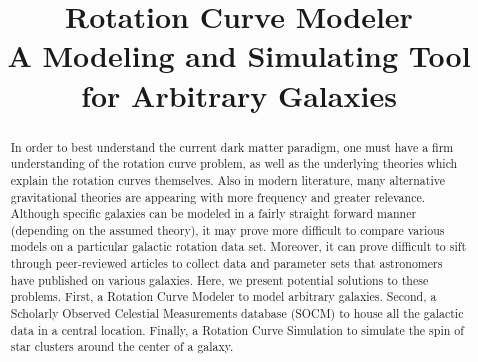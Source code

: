 \documentclass[conference]{IEEEtran-modified}
\begin{document}
\title{Rotation Curve Modeler \\ \Large{A Modeling and Simulating Tool for Arbitrary Galaxies}}

\author{
\and
{}
}

\onecolumn


\maketitle
\begin{abstract}
In order to best understand the current dark matter paradigm, one must have a firm understanding of the rotation curve problem, as well as the underlying theories which explain the rotation curves themselves.  Also in modern literature, many alternative gravitational theories are appearing with more frequency and greater relevance. Although specific galaxies can be modeled in a fairly straight forward manner (depending on the assumed theory), it may prove more difficult to compare various models on a particular galactic rotation data set.  Moreover, it can prove difficult to sift through peer-reviewed articles to collect data and parameter sets that astronomers have published on various galaxies. Here, we present potential solutions to these problems.  First, a Rotation Curve Modeler to model arbitrary galaxies.  Second, a Scholarly Observed Celestial Measurements database (SOCM) to house all the galactic data in a central location.  Finally, a Rotation Curve Simulation to simulate the spin of star clusters around the center of a galaxy.
\end{abstract}
	
\end{document}
